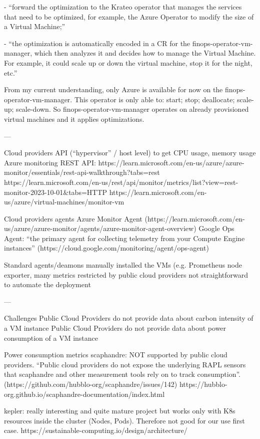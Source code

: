 - “forward the optimization to the Krateo operator that manages the services that need to be optimized, for example, the Azure Operator to modify the size of a Virtual Machine;”

- “the optimization is automatically encoded in a CR for the finops-operator-vm-manager, which then analyzes it and decides how to manage the Virtual Machine. For example, it could scale up or down the virtual machine, stop it for the night, etc.”

From my current understanding, only Azure is available for now on the finops-operator-vm-manager. 
This operator is only able to: start; stop; deallocate; scale-up; scale-down.
So finops-operator-vm-manager operates on already provisioned virtual machines and it applies optimizations.

---



Cloud providers API (“hypervisor” / host level) to get CPU usage, memory usage
Azure monitoring REST API: https://learn.microsoft.com/en-us/azure/azure-monitor/essentials/rest-api-walkthrough?tabs=rest%
https://learn.microsoft.com/en-us/rest/api/monitor/metrics/list?view=rest-monitor-2023-10-01&tabs=HTTP
https://learn.microsoft.com/en-us/azure/virtual-machines/monitor-vm 


Cloud providers agents
Azure Monitor Agent (https://learn.microsoft.com/en-us/azure/azure-monitor/agents/azure-monitor-agent-overview)
Google Ops Agent: “the primary agent for collecting telemetry from your Compute Engine instances” (https://cloud.google.com/monitoring/agent/ops-agent)


Standard agents/deamons manually installed the VMs (e.g. Prometheus node exporter, 
many metrics restricted by public cloud providers
not straightforward to automate the deployment


---

Challenges
Public Cloud Providers do not provide data about carbon intensity of a VM instance
Public Cloud Providers do not provide data about power consumption of a VM instance

Power consumption metrics
scaphandre: NOT supported by public cloud providers. “Public cloud providers do not expose the underlying RAPL sensors that scaphandre and other measurement tools rely on to track consumption”. (https://github.com/hubblo-org/scaphandre/issues/142)
https://hubblo-org.github.io/scaphandre-documentation/index.html

kepler: really interesting and quite mature project but works only with K8s resources inside the cluster (Nodes, Pods). Therefore not good for our use first case.
https://sustainable-computing.io/design/architecture/


